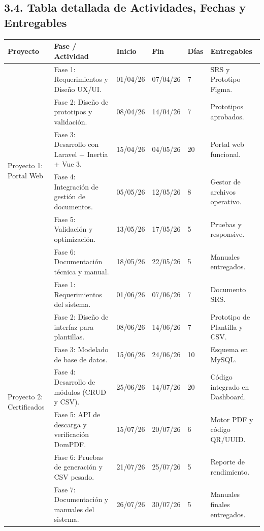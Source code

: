 \documentclass[11pt,a4paper]{article}
\begin{document}
\subsection*{3.4. Tabla detallada de Actividades, Fechas y Entregables}
\begin{longtable}{|p{1.8cm}|p{3.5cm}|p{1.8cm}|p{1.8cm}|p{0.8cm}|p{3.8cm}|}
\hline
\centering\textbf{Proyecto} & \centering\textbf{Fase / Actividad} & \textbf{Inicio} & \textbf{Fin} & \textbf{Días} & \centering\textbf{Entregables} \tabularnewline
\hline
\multirow{6}{1.8cm}{Proyecto 1: Portal Web} & Fase 1: Requerimientos y Diseño UX/UI. & 01/04/26 & 07/04/26 & 7 & SRS y Prototipo Figma. \tabularnewline
\cline{2-6}
& Fase 2: Diseño de prototipos y validación. & 08/04/26 & 14/04/26 & 7 & Prototipos aprobados. \tabularnewline
\cline{2-6}
& Fase 3: Desarrollo con Laravel + Inertia + Vue 3. & 15/04/26 & 04/05/26 & 20 & Portal web funcional. \tabularnewline
\cline{2-6}
& Fase 4: Integración de gestión de documentos. & 05/05/26 & 12/05/26 & 8 & Gestor de archivos operativo. \tabularnewline
\cline{2-6}
& Fase 5: Validación y optimización. & 13/05/26 & 17/05/26 & 5 & Pruebas y responsive. \tabularnewline
\cline{2-6}
& Fase 6: Documentación técnica y manual. & 18/05/26 & 22/05/26 & 5 & Manuales entregados. \tabularnewline
\hline
\multirow{7}{1.8cm}{Proyecto 2: Certificados} & Fase 1: Requerimientos del sistema. & 01/06/26 & 07/06/26 & 7 & Documento SRS. \tabularnewline
\cline{2-6}
& Fase 2: Diseño de interfaz para plantillas. & 08/06/26 & 14/06/26 & 7 & Prototipo de Plantilla y CSV. \tabularnewline
\cline{2-6}
& Fase 3: Modelado de base de datos. & 15/06/26 & 24/06/26 & 10 & Esquema en MySQL. \tabularnewline
\cline{2-6}
& Fase 4: Desarrollo de módulos (CRUD y CSV). & 25/06/26 & 14/07/26 & 20 & Código integrado en Dashboard. \tabularnewline
\cline{2-6}
& Fase 5: API de descarga y verificación DomPDF. & 15/07/26 & 20/07/26 & 6 & Motor PDF y código QR/UUID. \tabularnewline
\cline{2-6}
& Fase 6: Pruebas de generación y CSV pesado. & 21/07/26 & 25/07/26 & 5 & Reporte de rendimiento. \tabularnewline
\cline{2-6}
& Fase 7: Documentación y manuales del sistema. & 26/07/26 & 30/07/26 & 5 & Manuales finales entregados. \tabularnewline
\hline
\end{longtable}
\end{document}
